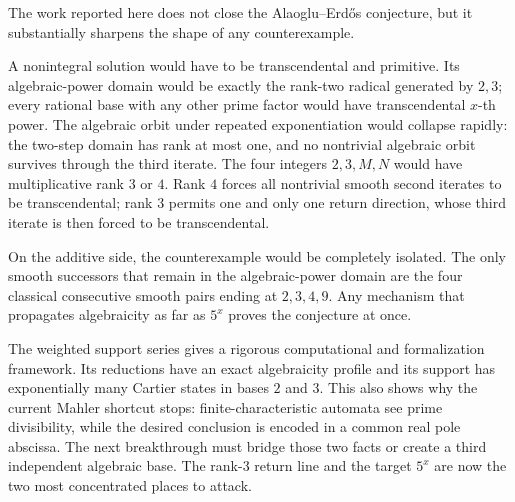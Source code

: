 \documentclass[11pt]{article}
\theoremstyle{definition}
\begin{document}
The work reported here does not close the Alaoglu--Erd\H{o}s conjecture, but it
substantially sharpens the shape of any counterexample.

A nonintegral solution would have to be transcendental and primitive.  Its
algebraic-power domain would be exactly the rank-two radical generated by
$2,3$; every rational base with any other prime factor would have
transcendental $x$-th power.  The algebraic orbit under repeated exponentiation
would collapse rapidly: the two-step domain has rank at most one, and no
nontrivial algebraic orbit survives through the third iterate.  The four
integers $2,3,M,N$ would have multiplicative rank $3$ or $4$.  Rank $4$ forces
all nontrivial smooth second iterates to be transcendental; rank $3$ permits
one and only one return direction, whose third iterate is then forced to be
transcendental.

On the additive side, the counterexample would be completely isolated.  The
only smooth successors that remain in the algebraic-power domain are the four
classical consecutive smooth pairs ending at $2,3,4,9$.  Any mechanism that
propagates algebraicity as far as $5^x$ proves the conjecture at once.

The weighted support series gives a rigorous computational and formalization
framework.  Its reductions have an exact algebraicity profile and its support
has exponentially many Cartier states in bases $2$ and $3$.  This also shows
why the current Mahler shortcut stops: finite-characteristic automata see
prime divisibility, while the desired conclusion is encoded in a common real
pole abscissa.  The next breakthrough must bridge those two facts or create a
third independent algebraic base.  The rank-$3$ return line and the target
$5^x$ are now the two most concentrated places to attack.
\end{document}
